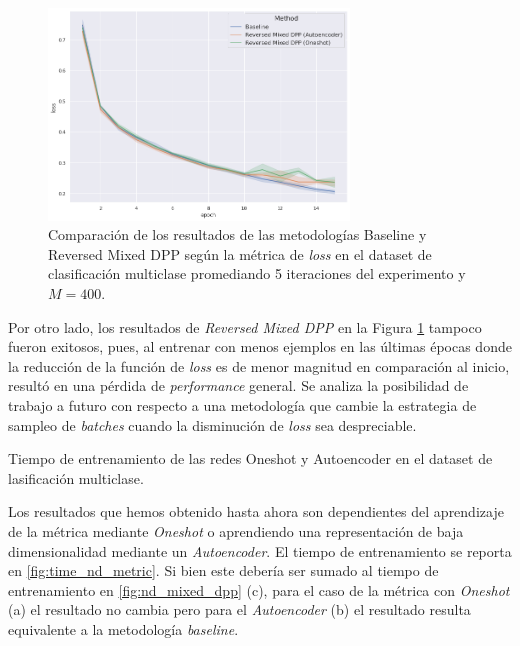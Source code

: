 \vspace{0.2cm}

\begin{figure}[ht]
    \centering
    \includegraphics[width=8cm]{img/tesis/resultados/loss_nd_reversed_mixed.jpg}
    \caption{Comparación de los resultados de las metodologías Baseline y Reversed Mixed DPP según la métrica de \textit{loss} en el dataset de clasificación multiclase promediando 5 iteraciones del experimento y $M=400$.}
    \label{fig:nd_reversed_mixed_dpp}
\end{figure}

Por otro lado, los resultados de \textit{Reversed Mixed DPP} en la Figura \ref{fig:nd_reversed_mixed_dpp} tampoco fueron exitosos, pues, al entrenar con menos ejemplos en las últimas épocas donde la reducción de la función de \textit{loss} es de menor magnitud en comparación al inicio, resultó en una pérdida de \textit{performance} general. Se analiza la posibilidad de trabajo a futuro con respecto a una metodología que cambie la estrategia de sampleo de \textit{batches} cuando la disminución de \textit{loss} sea despreciable. 

\begin{images}[\label{fig:time_nd_metric}]{\centering Tiempo de entrenamiento de las redes Oneshot y Autoencoder en el dataset de lasificación multiclase.}
\end{images}


Los resultados que hemos obtenido hasta ahora son dependientes del aprendizaje de la métrica mediante \textit{Oneshot} o aprendiendo una representación de baja dimensionalidad mediante un \textit{Autoencoder}. El tiempo de entrenamiento se reporta en \ref{fig:time_nd_metric}. Si bien este debería ser sumado al tiempo de entrenamiento en \ref{fig:nd_mixed_dpp} (c), para el caso de la métrica con \textit{Oneshot} (a) el resultado no cambia pero para el \textit{Autoencoder} (b) el resultado resulta equivalente a la metodología \textit{baseline}.

